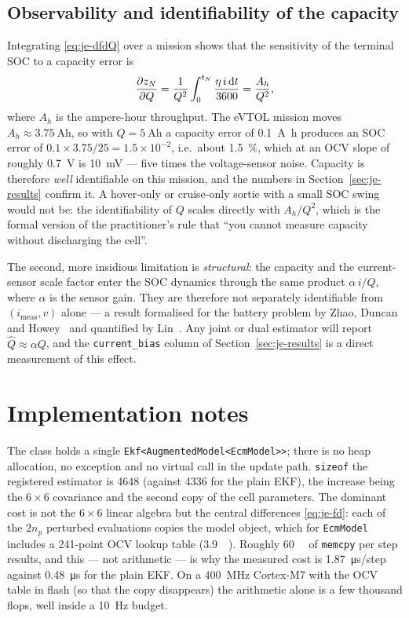 \subsection{Observability and identifiability of the capacity}
\label{sec:je-obs}
Integrating \eqref{eq:je-dfdQ} over a mission shows that the sensitivity of the terminal SOC to a
capacity error is
\begin{equation}
\frac{\partial z_N}{\partial Q}=\frac{1}{Q^2}\int_0^{t_N}\frac{\eta\, i\,\mathrm{d}t}{3600}
=\frac{A_h}{Q^2},
\label{eq:je-sens}
\end{equation}
where $A_h$ is the ampere-hour throughput.  The eVTOL mission moves
$A_h\approx\SI{3.75}{\ampere\hour}$, so with $Q=\SI{5}{\ampere\hour}$ a capacity error of
\SI{0.1}{\ampere\hour} produces an SOC error of $0.1\times3.75/25=1.5\times10^{-2}$, i.e.\ about
\SI{1.5}{\percent}, which at an OCV slope of roughly \SI{0.7}{\volt} is \SI{10}{\milli\volt} ---
five times the voltage-sensor noise.  Capacity is therefore \emph{well} identifiable on this
mission, and the numbers in Section~\ref{sec:je-results} confirm it.  A hover-only or cruise-only
sortie with a small SOC swing would not be: the identifiability of $Q$ scales directly with
$A_h/Q^2$, which is the formal version of the practitioner's rule that ``you cannot measure
capacity without discharging the cell''.

The second, more insidious limitation is \emph{structural}: the capacity and the current-sensor
scale factor enter the SOC dynamics through the same product $\alpha\, i/Q$, where $\alpha$ is the
sensor gain.  They are therefore not separately identifiable from $(i_\text{meas},v)$ alone --- a
result formalised for the battery problem by Zhao, Duncan and
Howey~\cite{zhao2017observability} and quantified by Lin~\cite{lin2018sensorbias}.  Any joint or
dual estimator will report $\hat{Q}\approx\alpha Q$, and the \texttt{current\_bias} column of
Section~\ref{sec:je-results} is a direct measurement of this effect.

\section{Implementation notes}
The class holds a single \texttt{Ekf<AugmentedModel<EcmModel>{}>}; there is no heap allocation, no
exception and no virtual call in the update path.  \texttt{sizeof} the registered estimator is
\SI{4648}{\byte} (against \SI{4336}{\byte} for the plain EKF), the increase being the $6\times6$
covariance and the second copy of the cell parameters.  The dominant cost is not the $6\times6$
linear algebra but the central differences \eqref{eq:je-fd}: each of the $2n_p$ perturbed
evaluations copies the model object, which for \texttt{EcmModel} includes a 241-point OCV lookup
table (\SI{3.9}{\kilo\byte}).  Roughly \SI{60}{\kilo\byte} of \texttt{memcpy} per step results, and
this --- not arithmetic --- is why the measured cost is \SI{1.87}{\micro\second}/step against
\SI{0.48}{\micro\second} for the plain EKF.  On a \SI{400}{\mega\hertz} Cortex-M7 with the OCV table
in flash (so that the copy disappears) the arithmetic alone is a few thousand flops, well inside a
\SI{10}{\hertz} budget.

